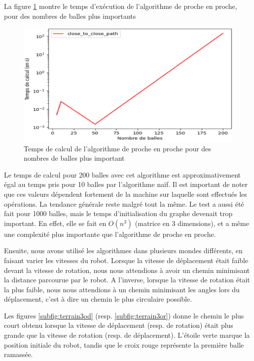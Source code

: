 \documentclass[12pt]{article}
\begin{document}
    La figure \ref{fig:timemoreballs} montre le temps d'exécution de l'algorithme de proche en proche, pour des nombres de balles plus importants

    \begin{figure}[H]
      \centering
      \includegraphics[width=\textwidth]{img/time_more_balls}
      \caption{Temps de calcul de l'algorithme de proche en proche pour des nombres de balles plus important}
      \label{fig:timemoreballs}
  \end{figure}

    Le temps de calcul pour 200 balles avec cet algorithme est approximativement égal au temps pris pour 10 balles par l'algorithme naïf. Il est important de noter que ces valeurs dépendent fortement de la machine sur laquelle sont effectués les opérations. La tendance générale reste malgré tout la même.
    Le test a aussi été fait pour 1000 balles, mais le temps d'initialisation du graphe devenait trop important. En effet, elle se fait en $O(n^3)$ (matrice en 3 dimensions), et a même une complexité plus importante que l'algorithme de proche en proche. 
    
    \medskip
    
    Ensuite, nous avons utilisé les algorithmes dans plusieurs mondes différents, en faisant varier les vitesses du robot. Lorsque la vitesse de déplacement était faible devant la vitesse de rotation, nous nous attendions à avoir un chemin minimisant la distance parcourue par le robot. A l'inverse, lorsque la vitesse de rotation était la plus faible, nous nous attendions à un chemin minimisant les angles lors du déplacement, c'est à dire un chemin le plus circulaire possible.

    Les figures \ref{subfig:terrain3od} (resp. \ref{subfig:terrain3or}) donne le chemin le plus court obtenu lorsque la vitesse de déplacement (resp. de rotation) était plus grande que la vitesse de rotation (resp. de déplacement). L'étoile verte marque la position initiale du robot, tandis que le croix rouge représente la première balle ramassée.
\end{document}
